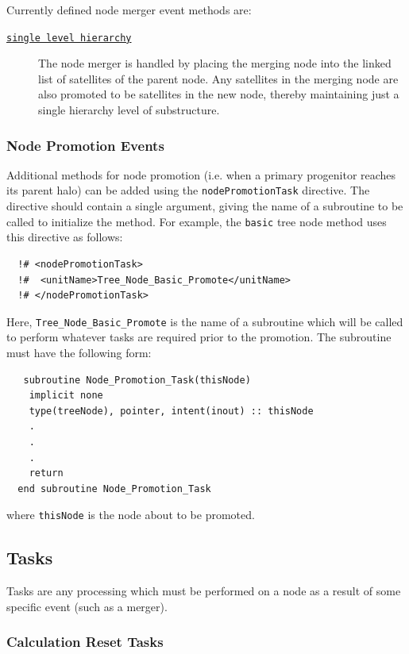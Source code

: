 Currently defined node merger event methods are:
\begin{description}
 \item [\hyperlink{events.node_merger.single_level_hierarchy.F90:events_node_mergers_slh:events_node_merger_do_slh}{{\tt single level hierarchy}}] The node merger is handled by placing the merging node into the linked list of satellites of the parent node. Any satellites in the merging node are also promoted to be satellites in the new node, thereby maintaining just a single hierarchy level of substructure.
\end{description}

\subsubsection{Node Promotion Events}

Additional methods for node promotion (i.e. when a primary progenitor reaches its parent halo) can be added using the {\tt nodePromotionTask} directive. The directive should contain a single argument, giving the name of a subroutine to be called to initialize the method. For example, the {\tt basic} tree node method uses this directive as follows:
\begin{verbatim}
  !# <nodePromotionTask>
  !#  <unitName>Tree_Node_Basic_Promote</unitName>
  !# </nodePromotionTask>
\end{verbatim}
Here, {\tt Tree\_Node\_Basic\_Promote} is the name of a subroutine which will be called to perform whatever tasks are required prior to the promotion. The subroutine must have the following form:
\begin{verbatim}
   subroutine Node_Promotion_Task(thisNode)
    implicit none
    type(treeNode), pointer, intent(inout) :: thisNode
    .
    .
    .
    return
  end subroutine Node_Promotion_Task
\end{verbatim}
where {\tt thisNode} is the node about to be promoted.

\subsection{Tasks}

Tasks are any processing which must be performed on a node as a result of some specific event (such as a merger).

\subsubsection{Calculation Reset Tasks}\label{sec:CalculationResetTask}

